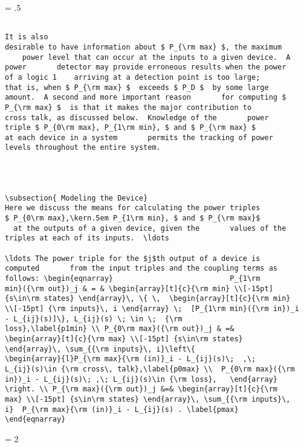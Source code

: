 \newpage
\baselineskip = .5\baselineskip  %
\begin{verbatim}

It is also
desirable to have information about $ P_{\rm max} $, the maximum
    power level that can occur at the inputs to a given device.  A
power       detector may provide erroneous results when the power
of a logic 1    arriving at a detection point is too large;
that is, when $ P_{\rm max} $  exceeds $ P_D $  by some large
amount.  A second and more important reason       for computing $
P_{\rm max} $  is that it makes the major contribution to
cross talk, as discussed below.  Knowledge of the       power
triple $ P_{0\rm max}, P_{1\rm min}, $ and $ P_{\rm max} $
at each device in a system       permits the tracking of power
levels throughout the entire system.




\subsection{ Modeling the Device}
Here we discuss the means for calculating the power triples
$ P_{0\rm max},\kern.5em P_{1\rm min}, $ and $ P_{\rm max}$
  at the outputs of a given device, given the       values of the
triples at each of its inputs.  \ldots

\ldots The power triple for the $j$th output of a device is
computed       from the input triples and the coupling terms as
follows: \begin{eqnarray}                           P_{1\rm
min}({\rm out})_j & = & \begin{array}[t]{c}{\rm min} \\[-15pt]
{s\in\rm states} \end{array}\, \{ \,  \begin{array}[t]{c}{\rm min}
\\[-15pt] {\rm inputs}\, i \end{array} \;  [P_{1\rm min}({\rm in})_i
- L_{ij}(s)]\}, L_{ij}(s) \; \in \;  {\rm
loss},\label{p1min} \\ P_{0\rm max}({\rm out})_j & =&
\begin{array}[t]{c}{\rm max} \\[-15pt] {s\in\rm states}
\end{array}\, \sum_{{\rm inputs}\, i}\left\{
\begin{array}{l}P_{\rm max}{\rm (in)}_i - L_{ij}(s)\;  ,\;
L_{ij}(s)\in {\rm cross\, talk},\label{p0max} \\  P_{0\rm max}({\rm
in})_i - L_{ij}(s)\; ,\; L_{ij}(s)\in {\rm loss},   \end{array}
\right. \\ P_{\rm max}({\rm out})_j &=& \begin{array}[t]{c}{\rm
max} \\[-15pt] {s\in\rm states} \end{array}\, \sum_{{\rm inputs}\,
i}  P_{\rm max}{\rm (in)}_i - L_{ij}(s) . \label{pmax}
\end{eqnarray}

\end{verbatim}
\newpage
\baselineskip = 2\baselineskip  %


